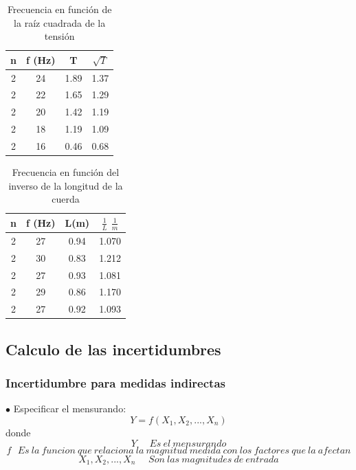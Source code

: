 \documentclass{article}
\begin{document}
\begin{table}[h!]
\centering
\begin{tabular}{ |c|c|c|c| } 
 \hline
 n & f (Hz) & T & $\sqrt{T}$ \\ 
 \hline
 2 & 24 & 1.89 & 1.37 \\ 
 2 & 22 & 1.65 & 1.29 \\  
 2 & 20 & 1.42 & 1.19 \\  
 2 & 18 & 1.19 & 1.09 \\ 
 2 & 16 & 0.46 & 0.68 \\  
 \hline
\end{tabular}
\caption{Frecuencia en función de la raíz cuadrada de la tensión}
\label{table:1}
\end{table}

\begin{table}[h!]
\centering
\begin{tabular}{ |c|c|c|c| } 
 \hline
 n & f (Hz) & L(m) & $\frac{1}{L}$ $\frac{1}{m}$\\ 
 \hline
 2 & 27 & 0.94 & 1.070 \\ 
 2 & 30 & 0.83 & 1.212 \\  
 2 & 27 & 0.93 & 1.081 \\  
 2 & 29 & 0.86 & 1.170 \\ 
 2 & 27 & 0.92 & 1.093 \\  
 \hline
\end{tabular}
\caption{Frecuencia en función del inverso de la longitud de la cuerda}
\label{table:1}
\end{table}

\subsection{Calculo de las incertidumbres}
\subsubsection{Incertidumbre para medidas indirectas}
$\bullet$ Especificar el mensurando:
\begin{equation}
    Y=f(X_{1},X_{2},...,X_{n})
\end{equation}
donde 
\begin{equation*}
    Y \ \ \ \ \ \ Es \ el \ mensurando
\end{equation*}
\begin{equation*}
    f \ \ \ Es \ la \ funcion \ que \ relaciona \ la \
    magnitud \ medida \ con \ los \ factores \ que \ la \ afectan 
\end{equation*}
\begin{equation*}
    X_{1},X_{2},...,X_{n} \ \ \ \ \ \ Son \ las \ magnitudes \ de \ entrada
\end{equation*}
\end{document}
